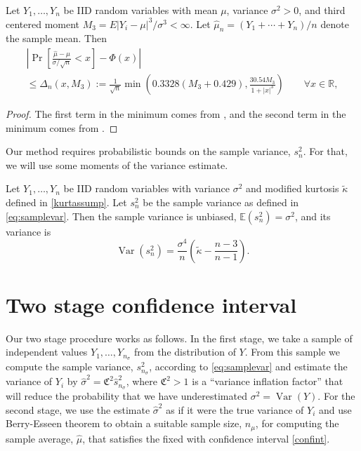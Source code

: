 \documentclass[graybox]{svmult}
\newcommand{\fudge}{\mathfrak{C}}
\newcommand\reals{\mathbb{R}}
\newcommand\e{\mathbb{E}}
\newcommand{\Prob}{\Pr}
\newcommand{\abs}[1]{\left|#1\right|}
\DeclareMathOperator{\var}{Var}
\newcommand{\hmu}{\hat{\mu}}
\def\abs#1{\ensuremath{\left \lvert #1 \right \rvert}}
\begin{document}
\begin{theorem} \label{BE} Let $Y_1,\dots,Y_n$ be IID random variables with mean
$\mu$, variance $\sigma^2>0$, and third centered moment $M_3=E\abs{Y_i - \mu}^3/\sigma^3 < \infty$.  Let $\hmu_n=(Y_1 +\cdots + Y_n)/n$ denote the sample mean.
Then
\begin{multline*}
\abs{\Prob\left[\frac{\hmu-\mu}{\sigma/\sqrt{n}} <x
\right]-\Phi(x)} \\
\leq \Delta_n(x,M_3) := \frac{1}{\sqrt{n}} \min\left(0.3328(M_3+0.429), \frac{30.54 M_3}{1+\abs{x}^{3}} \right) \qquad \forall x \in \reals,
\end{multline*}
\end{theorem}
\begin{proof}  The first term in the minimum comes from \cite{???}, and the second term in the minimum comes from \cite{???}.
\end{proof}

Our method requires probabilistic bounds on the sample variance, $s_n^2$. For that,
we will use some moments of the variance estimate.

\begin{theorem} \cite[Eq.\ (7.16), p.\ 265]{Mil86} \label{Varvarthm} Let $Y_1, \ldots, Y_n$ be IID random variables with variance $\sigma^2$ and modified
kurtosis $\tilde \kappa$ defined in \eqref{kurtassump}.
Let  $s^2_n$ be the sample variance as defined in \eqref{eq:samplevar}.  Then the sample variance is unbiased, $\e(s^2_n)=\sigma^2$, and its variance is
\[
\var(s^2_n) = \frac{\sigma^4}{n} \left ( \tilde\kappa  - \frac{n-3}{n-1} \right).
\]
\end{theorem}

\section{Two stage confidence interval}\label{sec:twostage}

Our two stage procedure works as follows.
In the first stage, we take a sample of 
independent values $Y_1,\dots,Y_{n_\sigma}$
from the distribution of $Y$.
From this sample we compute the sample variance, 
$s^2_{n_\sigma}$, according to 
\eqref{eq:samplevar} and estimate
the variance of $Y_i$ by
$\hat\sigma^2 = \fudge^2\hat s_{n_\sigma}^2$, where
$\fudge^2>1$ is a ``variance inflation factor''
that will reduce the probability that we have
underestimated $\sigma^2=\var(Y)$.
For the second stage, we use the estimate
$\hat \sigma^2$ as if it were the true
variance of $Y_i$ and use
Berry-Esseen theorem to obtain a suitable
sample size, $n_{\mu}$, for computing the sample average, $\hmu$, that satisfies the fixed with confidence interval \eqref{confint}.
\end{document}
